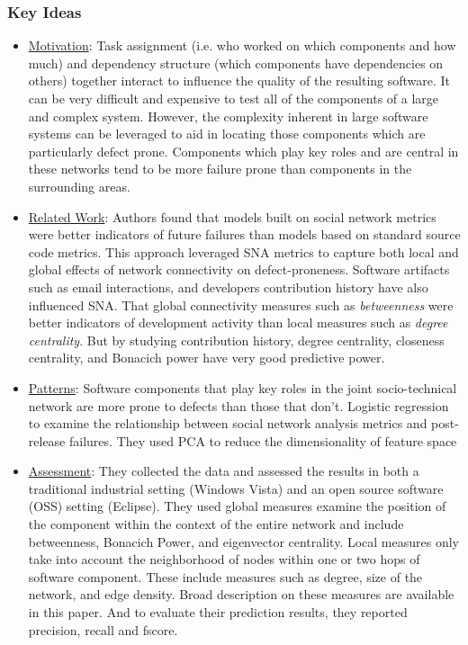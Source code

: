 \documentclass[conference]{IEEEtran}
\begin{document}
\subsubsection{\textbf{Key Ideas}}
\begin{itemize}
    \item \underline{Motivation}: Task assignment (i.e. who worked on which components and how much) and dependency structure (which components have dependencies on others) together interact to influence the quality of the resulting software. It can be very difficult and expensive to test all of the components of a large and complex system. However, the complexity inherent in large software systems can be leveraged to aid in locating those components which are particularly defect prone. Components which play key roles and are central in these networks tend to be more failure prone than components in the surrounding areas.
    \item \underline{Related Work}: Authors found that models built on social network metrics were better indicators of future failures than models based on standard source code metrics. This approach leveraged SNA metrics to capture both local and global effects of network connectivity on defect-proneness. Software artifacts such as email interactions, and developers contribution history have also influenced SNA. That global connectivity measures such as \textit{betweenness} were better indicators of development activity than local measures such as \textit{degree centrality}. But by studying contribution history, degree centrality, closeness centrality, and Bonacich power have very good predictive power.
    \item \underline{Patterns}: Software components that play key roles in the joint socio-technical network are more prone to defects than those that don't. Logistic regression to examine the relationship between social network analysis metrics and post-release failures. They used PCA to reduce the dimensionality of feature space
    \item \underline{Assessment}: They collected the data and assessed the results in both a traditional industrial setting (Windows Vista) and an open source software (OSS) setting (Eclipse). They used global measures examine the position of the component within the context of the entire network and include betweenness, Bonacich Power, and eigenvector centrality. Local measures only take into account the neighborhood of nodes within one or two hops of software component. These include measures such as degree, size of the network, and edge density. Broad description on these measures are available in this paper. And to evaluate their prediction results, they reported precision, recall and fscore.
\end{itemize}
\end{document}
